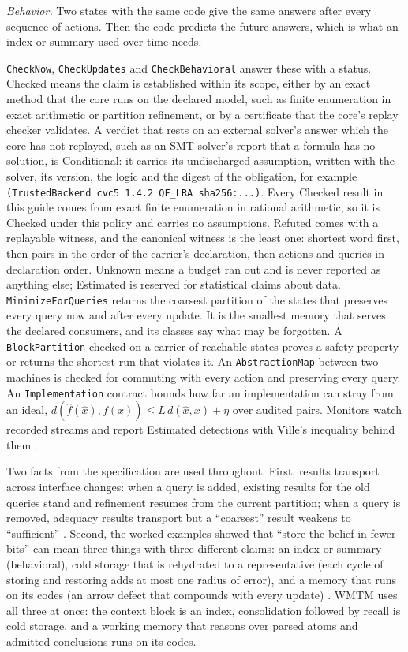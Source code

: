 \documentclass[11pt]{article}
\newcommand{\code}[1]{\texttt{#1}}
\theoremstyle{definition}
\theoremstyle{plain}
\begin{document}
\emph{Behavior.} Two states with the same code give the same answers after every sequence of
actions. Then the code predicts the future answers, which is what an index or summary used over
time needs.

\code{CheckNow}, \code{CheckUpdates} and \code{CheckBehavioral} answer these with a status. Checked
means the claim is established within its scope, either by an exact method that the core runs on
the declared model, such as finite enumeration in exact arithmetic or partition refinement, or by
a certificate that the core's replay checker validates. A verdict that rests on an external
solver's answer which the core has not replayed, such as an SMT solver's report that a formula has
no solution, is Conditional: it carries its undischarged assumption, written with the solver, its
version, the logic and the digest of the obligation, for example
\code{(TrustedBackend cvc5 1.4.2 QF\_LRA sha256:...)}. Every Checked result in this guide comes
from exact finite enumeration in rational arithmetic, so it is Checked under this policy and
carries no assumptions. Refuted comes with a replayable witness, and the canonical witness is the
least one: shortest word first, then pairs in the order of the carrier's declaration, then actions
and queries in declaration order. Unknown means a budget ran out and is never reported as anything
else; Estimated is reserved for statistical claims about data.
\code{MinimizeForQueries} returns the coarsest partition of the states that preserves every
query now and after every update. It is the smallest memory that serves the declared consumers,
and its classes say what may be forgotten. A \code{BlockPartition} checked on a carrier of
reachable states proves a safety property or returns the shortest run that violates it. An
\code{AbstractionMap} between two machines is checked for commuting with every action and
preserving every query. An \code{Implementation} contract bounds how far an implementation can
stray from an ideal, $d(\hat f(\hat x),f(x))\le L\,d(\hat x,x)+\eta$ over audited pairs. Monitors
watch recorded streams and report Estimated detections with Ville's inequality behind them
\cite{worked}.

Two facts from the specification are used throughout. First, results transport across interface
changes: when a query is added, existing results for the old queries stand and refinement resumes
from the current partition; when a query is removed, adequacy results transport but a ``coarsest''
result weakens to ``sufficient'' \cite[Section~4.8]{spec}. Second, the worked examples showed that
``store the belief in fewer bits'' can mean three things with three different claims: an index or
summary (behavioral), cold storage that is rehydrated to a representative (each cycle of storing and
restoring adds at most one radius of error), and a memory that runs on its codes (an arrow defect
that compounds with every update) \cite[Section~3.7]{worked}. WMTM uses all three at once: the context block is an
index, consolidation followed by recall is cold storage, and a working memory that reasons over
parsed atoms and admitted conclusions runs on its codes.
\end{document}
